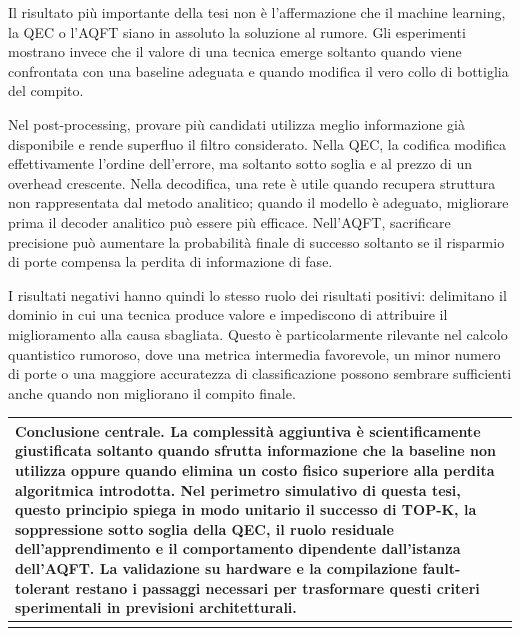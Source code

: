Il risultato più importante della tesi non è l'affermazione che il machine learning, la QEC o l'AQFT siano in assoluto la soluzione al rumore. Gli esperimenti mostrano invece che il valore di una tecnica emerge soltanto quando viene confrontata con una baseline adeguata e quando modifica il vero collo di bottiglia del compito.

Nel post-processing, provare più candidati utilizza meglio informazione già disponibile e rende superfluo il filtro considerato. Nella QEC, la codifica modifica effettivamente l'ordine dell'errore, ma soltanto sotto soglia e al prezzo di un overhead crescente. Nella decodifica, una rete è utile quando recupera struttura non rappresentata dal metodo analitico; quando il modello è adeguato, migliorare prima il decoder analitico può essere più efficace. Nell'AQFT, sacrificare precisione può aumentare la probabilità finale di successo soltanto se il risparmio di porte compensa la perdita di informazione di fase.

I risultati negativi hanno quindi lo stesso ruolo dei risultati positivi: delimitano il dominio in cui una tecnica produce valore e impediscono di attribuire il miglioramento alla causa sbagliata. Questo è particolarmente rilevante nel calcolo quantistico rumoroso, dove una metrica intermedia favorevole, un minor numero di porte o una maggiore accuratezza di classificazione possono sembrare sufficienti anche quando non migliorano il compito finale.

{\def\LTcaptype{none} %
\begin{longtable}[]{@{}
  >{\raggedright\arraybackslash}p{}@{}}
\toprule\noalign{}
\begin{minipage}[b]{\linewidth}\raggedright
\textbf{Conclusione centrale.} La complessità aggiuntiva è scientificamente giustificata soltanto quando sfrutta informazione che la baseline non utilizza oppure quando elimina un costo fisico superiore alla perdita algoritmica introdotta. Nel perimetro simulativo di questa tesi, questo principio spiega in modo unitario il successo di TOP-K, la soppressione sotto soglia della QEC, il ruolo residuale dell'apprendimento e il comportamento dipendente dall'istanza dell'AQFT. La validazione su hardware e la compilazione fault-tolerant restano i passaggi necessari per trasformare questi criteri sperimentali in previsioni architetturali.
\end{minipage} \\
\midrule\noalign{}
\endhead
\bottomrule\noalign{}
\endlastfoot
\end{longtable}
}
\fi

